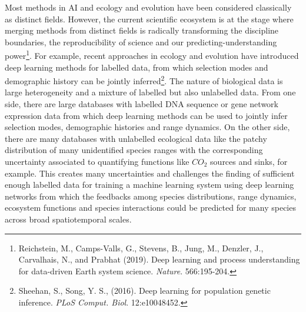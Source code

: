 \documentclass[authoryear,1p,12pt]{elsarticle}
\begin{document}
Most methods in AI and ecology and evolution have been considered
classically as distinct fields. However, the current scientific
ecosystem is at the stage where merging methods from distinct fields
is radically transforming the discipline boundaries, the
reproducibility of science and our predicting-understanding
power\footnote{Reichstein, M., Camps-Valls, G., Stevens, B., Jung, M.,
  Denzler, J., Carvalhais, N., and Prabhat (2019). Deep learning and
  process understanding for data-driven Earth system science. {\em
    Nature}. 566:195-204.}. For example, recent approaches in ecology
and evolution have introduced deep learning methods for labelled data,
from which selection modes and demographic history can be jointly
inferred\footnote{Sheehan, S., Song, Y. S., (2016). Deep learning for
  population genetic inference.  {\em PLoS
    Comput. Biol}. 12:e10048452.}. The nature of biological data is
large heterogeneity and a mixture of labelled but also unlabelled
data. From one side, there are large databases with labelled DNA
sequence or gene network expression data from which deep learning
methods can be used to jointly infer selection modes, demographic
histories and range dynamics. On the other side, there are many
databases with unlabelled ecological data like the patchy distribution
of many unidentified species ranges with the corresponding uncertainty
associated to quantifying functions like $CO_2$ sources and sinks, for
example. This creates many uncertainties and challenges the finding of
sufficient enough labelled data for training a machine learning system
using deep learning networks from which the feedbacks among species
distributions, range dynamics, ecosystem functions and species
interactions could be predicted for many species across broad
spatiotemporal scales.
\end{document}
